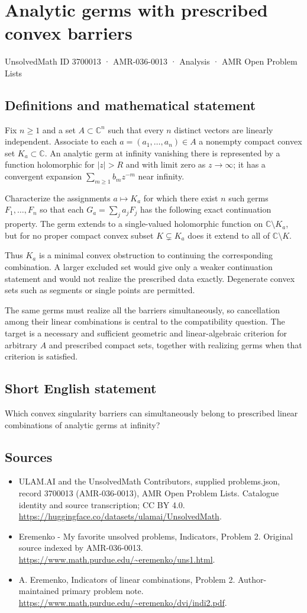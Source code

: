\documentclass[11pt,a4paper]{article}
\begin{document}
\section*{Analytic germs with prescribed convex barriers}\label{3700013}
{\small UnsolvedMath ID 3700013 · AMR-036-0013 · Analysis · AMR Open Problem Lists}
\subsection{Definitions and mathematical statement}
Fix $n\geq1$ and a set $A\subset\mathbb C^n$ such that
every $n$ distinct vectors are linearly independent. Associate
to each $a=(a_1,\ldots,a_n)\in A$ a nonempty compact convex
set $K_a\subset\mathbb C$.
An analytic germ at infinity vanishing there is represented
by a function holomorphic for $|z|>R$ and with limit zero
as $z\to\infty$; it has a convergent expansion
$\sum_{m\geq1}b_mz^{-m}$ near infinity.

Characterize the assignments $a\mapsto K_a$ for which there
exist $n$ such germs $F_1,\ldots,F_n$ so that each
$G_a=\sum_ja_jF_j$ has the following exact continuation
property. The germ extends to a single-valued holomorphic
function on $\mathbb C\setminus K_a$, but for no proper
compact convex subset $K\subsetneq K_a$ does it extend
to all of $\mathbb C\setminus K$.

Thus $K_a$ is a minimal convex obstruction to continuing
the corresponding combination. A larger excluded set would
give only a weaker continuation statement and would not
realize the prescribed data exactly. Degenerate convex
sets such as segments or single points are permitted.

The same germs must realize all the barriers simultaneously,
so cancellation among their linear combinations is central
to the compatibility question. The target is a necessary
and sufficient geometric and linear-algebraic criterion for
arbitrary $A$ and prescribed compact sets, together with
realizing germs when that criterion is satisfied.
\subsection{Short English statement}
Which convex singularity barriers can simultaneously belong to prescribed linear combinations of analytic germs at infinity?
\subsection{Sources}
\begin{itemize}
\item[S1] ULAM.AI and the UnsolvedMath Contributors, supplied problems.json, record 3700013 (AMR-036-0013), AMR Open Problem Lists. Catalogue identity and source transcription; CC BY 4.0.
\url{https://huggingface.co/datasets/ulamai/UnsolvedMath}.
\item[S2] Eremenko - My favorite unsolved problems, Indicators, Problem 2. Original source indexed by AMR-036-0013.
\url{https://www.math.purdue.edu/~eremenko/uns1.html}.
\item[S3] A. Eremenko, Indicators of linear combinations, Problem 2. Author-maintained primary problem note.
\url{https://www.math.purdue.edu/~eremenko/dvi/indi2.pdf}.
\end{itemize}
\end{document}
